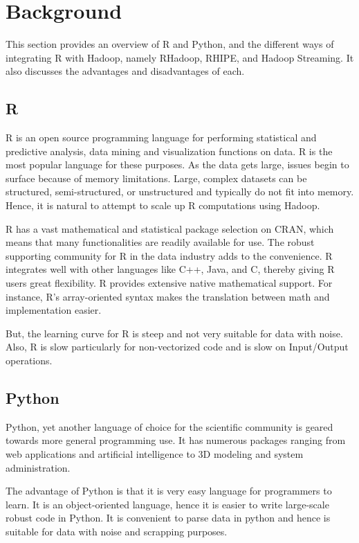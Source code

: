 \documentclass[
journal=jacsat, %
manuscript=article]{achemso}
\begin{document}
\section{Background}
This section provides an overview of R and Python, and the different ways of integrating R with Hadoop, namely RHadoop, RHIPE, and Hadoop Streaming. It also discusses the advantages and disadvantages of each.

\subsection{R}
R is an open source programming language for performing statistical and predictive analysis, data mining and visualization functions on data. R is the most popular language for these purposes. As the data gets large, issues begin to surface because of memory limitations. Large, complex datasets can be structured, semi-structured, or unstructured and typically do not fit into memory. Hence, it is natural to attempt to scale up R computations using Hadoop. 

R has a vast mathematical and statistical package selection on CRAN, which means that many functionalities are readily available for use. The robust supporting community for R in the data industry adds to the convenience. R integrates well with other languages like C++, Java, and C, thereby giving R users great flexibility. R provides extensive native mathematical support. For instance, R's array-oriented syntax makes the translation between math and implementation easier. 

But, the learning curve for R is steep and not very suitable for data with noise. Also, R is slow particularly for non-vectorized code and is slow on Input/Output operations. 

\subsection{Python}
Python, yet another language of choice for the scientific community is geared towards more general programming use. It has numerous packages ranging from web applications and artificial intelligence to 3D modeling and system administration. 

The advantage of Python is that it is very easy language for programmers to learn. It is an object-oriented language, hence it is easier to write large-scale robust code in Python. It is convenient to parse data in python and hence is suitable for data with noise and scrapping purposes. 
\end{document}
